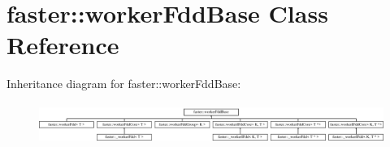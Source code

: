 \hypertarget{classfaster_1_1workerFddBase}{}\section{faster\+:\+:worker\+Fdd\+Base Class Reference}
\label{classfaster_1_1workerFddBase}
Inheritance diagram for faster\+:\+:worker\+Fdd\+Base\+:\begin{figure}[H]
\begin{center}
\leavevmode
\includegraphics[height=1.365854cm]{classfaster_1_1workerFddBase}
\end{center}
\end{figure}
